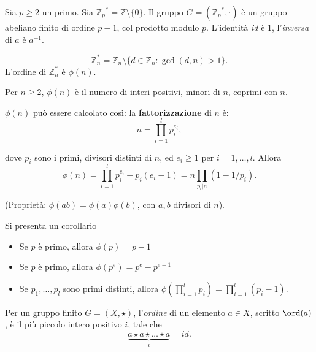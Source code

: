 \begin{definition}
    Sia $p\geq 2$ un primo. Sia ${\mathbb{Z}_p}^*=\mathbb{Z}\setminus\{0\}$. Il gruppo $G=({\mathbb{Z}_p}^*,\cdot)$ è un gruppo abeliano finito di ordine $p-1$, col prodotto modulo $p$. L'identità \textit{id} è $1$, l'\textit{inversa} di $a$ è $a^{-1}$. 
    
    \vspace{1em}
    \[
        \mathbb{Z}_n^*=\mathbb{Z}_n \setminus \{ d \in \mathbb{Z}_n : \gcd(d,n) > 1\}. 
    \]
    L'ordine di $\mathbb{Z}_n^*$ è $\phi(n)$. 
\end{definition}

\begin{definition}
    Per $n \geq 2$, $\phi(n)$ è il numero di interi positivi, minori di $n$, coprimi con $n$.  
\end{definition}

\begin{theorem}
    $\phi(n)$ può essere calcolato così: la \textbf{fattorizzazione} di $n$ è:
    \[
    n=\prod_{i=1}^{l}p_i^{e_i}, 
    \] 
    
    dove $p_i$ sono i primi, divisori distinti di $n$, ed $e_i \geq 1 $ per $i=1, \dots, l$. Allora 
    \[
    \phi(n)=\prod_{i=1}^{l}p_i^{e_i}-p_i(e_i-1)=n\prod_{p_i|n}(1-1/p_i).
    \]
\end{theorem} 

(Proprietà: $\phi(ab)=\phi(a)\phi(b)$, con $a,b$ divisori di $n$). 

\begin{corollary}Si presenta un corollario
    \begin{itemize}
        \item Se $p$ è primo, allora $\phi(p)=p-1$
        \item Se $p$ è primo, allora $\phi(p^e)=p^e-p^{e-1}$
        \item Se $p_1, \dots, p_l$ sono primi distinti, allora $\phi(\prod_{i=1}^{l}p_i)=\prod_{i=1}^{l}(p_i-1)$.
    \end{itemize}
\end{corollary}

\begin{definition}
    Per un gruppo finito $G=(X, \star)$, l'\textit{ordine} di un elemento $a \in X$, scritto $\ord(a)$, è il più piccolo intero positivo $i$, tale che 
   \[
   \underbrace{a \star a \star \dots \star a}_{i} = id.
   \]

\end{definition}

